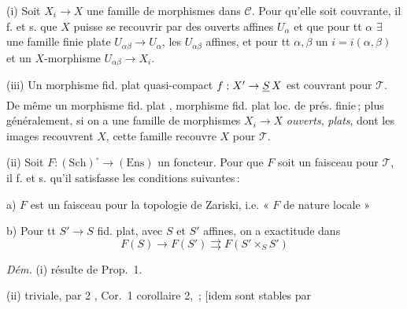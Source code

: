 \documentclass[11pt,a4paper]{article}
\begin{document}
(i) Soit $X_i \to X$ une famille de morphismes dans $\mathcal{C}$. Pour
qu'elle soit couvrante, il f. et s. que $X$ puisse se recouvrir par des
ouverts affines $U_\alpha$ et que pour tt $\alpha$ $\exists$ une famille finie
 plate $U_{\alpha\beta} \to U_\alpha$, les $U_{\alpha\beta}$ affines,
\struck{\ill{}} et pour tt $\alpha, \beta$ un $i = i(\alpha, \beta)$ et un
$X$-morphisme $U_{\alpha\beta} \to X_i$.



(iii) Un morphisme fid. plat quasi-compact $f : X' \to \struck{S}\,X$ est
couvrant pour $\mathcal{T}$. De même un  morphisme fid.
plat , morphisme fid. plat loc. de prés.
finie\,; plus généralement, si on a une famille de morphismes $X_i \to X$
\emph{ouverts}, \emph{plats}, dont les images recouvrent $X$, cette famille
recouvre $X$ pour $\mathcal{T}$.

(ii) Soit $F : (\mathrm{Sch})^{\circ} \to (\mathrm{Ens})$ un foncteur. Pour
que $F$ soit un faisceau pour $\mathcal{T}$, il f. et s. qu'il satisfasse les
conditions suivantes\,:

a) $F$ est un faisceau pour la topologie de Zariski,
i.e. « $F$ de nature locale »

b) Pour tt $S' \to S$ fid. plat, avec $S$ et $S'$ affines, on a exactitude
dans
\[
  F(S) \to F(S') \rightrightarrows F(S' \times_S S')
\]

\emph{Dém.} (i) résulte de Prop.~1.

(ii)  triviale, par 2 , Cor.~1 corollaire 2,
\ill{}\,; 
 [idem
 \ill{} \ill{} sont stables par



\end{document}
